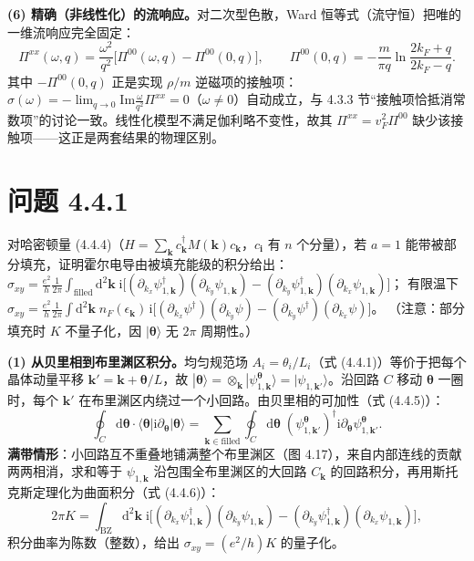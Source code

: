 \textbf{(6) 精确（非线性化）的流响应。}对二次型色散，Ward 恒等式（流守恒）把唯的一维流响应完全固定：
\begin{equation*}
\Pi^{xx}(\omega,q)=\frac{\omega^2}{q^2}\Big[\Pi^{00}(\omega,q)-\Pi^{00}(0,q)\Big],
\qquad
\Pi^{00}(0,q)=-\frac{m}{\pi q}\ln\frac{2k_F+q}{2k_F-q} .
\end{equation*}
其中 $-\Pi^{00}(0,q)$ 正是实现 $\rho/m$ 逆磁项的接触项：$\sigma(\omega)=-\lim_{q\to0}\mathrm{Im}\frac{\omega}{q^2}\Pi^{xx}=0$（$\omega\neq0$）自动成立，与 4.3.3 节“接触项恰抵消常数项”的讨论一致。线性化模型不满足伽利略不变性，故其 $\Pi^{xx}=v_F^2\Pi^{00}$ 缺少该接触项——这正是两套结果的物理区别。

\section*{问题 4.4.1}
\begin{problem}
对哈密顿量 (4.4.4)（$H=\sum_{\pmb k}c^\dagger_{\pmb k}M(\pmb k)c_{\pmb k}$，$c_{\pmb i}$ 有 $n$ 个分量），若 $a=1$ 能带被部分填充，证明霍尔电导由被填充能级的积分给出：
$\sigma_{xy}=\frac{e^2}{h}\frac{1}{2\pi}\int_{\text{filled}}\mathrm{d}^2\pmb k\;
\mathrm{i}\big[(\partial_{k_x}\psi^\dagger_{1,\pmb k})(\partial_{k_y}\psi_{1,\pmb k})-(\partial_{k_y}\psi^\dagger_{1,\pmb k})(\partial_{k_x}\psi_{1,\pmb k})\big]$；
有限温下 $\sigma_{xy}=\frac{e^2}{h}\frac{1}{2\pi}\int\mathrm{d}^2\pmb k\;n_F(\epsilon_{\pmb k})\,
\mathrm{i}\big[(\partial_{k_x}\psi^\dagger)(\partial_{k_y}\psi)-(\partial_{k_y}\psi^\dagger)(\partial_{k_x}\psi)\big]$。
（注意：部分填充时 $K$ 不量子化，因 $|\pmb\theta\rangle$ 无 $2\pi$ 周期性。）
\end{problem}
\solution
\textbf{(1) 从贝里相到布里渊区积分。}均匀规范场 $A_i=\theta_i/L_i$（式 (4.4.1)）等价于把每个晶体动量平移 $\pmb k'=\pmb k+\pmb\theta/L$，故 $|\pmb\theta\rangle=\otimes_{\pmb k}|\psi^{\pmb\theta}_{1,\pmb k}\rangle=|\psi_{1,\pmb k'}\rangle$。沿回路 $C$ 移动 $\pmb\theta$ 一圈时，每个 $\pmb k'$ 在布里渊区内绕过一个小回路。由贝里相的可加性（式 (4.4.5)）：
\begin{equation*}
\oint_C\mathrm{d}\pmb\theta\cdot\langle\pmb\theta|\mathrm{i}\partial_{\pmb\theta}|\pmb\theta\rangle
=\sum_{\pmb k\in\text{filled}}\oint_C\mathrm{d}\pmb\theta\;
(\psi_{1,\pmb k'}^{\pmb\theta})^\dagger\mathrm{i}\partial_{\pmb\theta}\psi^{\pmb\theta}_{1,\pmb k'} .
\end{equation*}
\textbf{满带情形}：小回路互不重叠地铺满整个布里渊区（图 4.17），来自内部连线的贡献两两相消，求和等于 $\psi_{1,\pmb k}$ 沿包围全布里渊区的大回路 $C_{\pmb k}$ 的回路积分，再用斯托克斯定理化为曲面积分（式 (4.4.6)）：
\begin{equation*}
2\pi K=\int_{\text{BZ}}\mathrm{d}^2\pmb k\;
\mathrm{i}\big[(\partial_{k_x}\psi^\dagger_{1,\pmb k})(\partial_{k_y}\psi_{1,\pmb k})-(\partial_{k_y}\psi^\dagger_{1,\pmb k})(\partial_{k_x}\psi_{1,\pmb k})\big],
\end{equation*}
积分曲率为陈数（整数），给出 $\sigma_{xy}=(e^2/h)K$ 的量子化。

